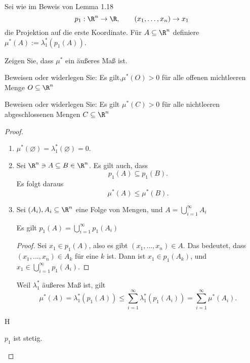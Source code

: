 \begin{Problem}
	Sei wie im Beweis von Lemma 1.18
	\[
	p_1:\R^n\to \R, \qquad (x_1,\dots,x_n)\to x_1
	\]
	die Projektion auf die erste Koordinate. F\"{u}r $A\subseteq \R^n$ definiere $\mu^*(A):=\lambda_1^*(p_1(A))$.
	\begin{parts}
		\item Zeigen Sie, dass $\mu^*$ ein äußeres Maß ist.
		\item Beweisen oder widerlegen Sie: Es gilt,$\mu^*(O)>0$ f\"{u}r alle offenen michtleeren Menge $O\subseteq \R^n$
		\item Beweisen oder widerlegen Sie: Es gilt  $\mu^*(C)>0$ f\"{u}r alle nichtleeren abgeschlossenen Mengen $C\subseteq \R^n$
	\end{parts}
\end{Problem}
\begin{proof}	
	\begin{parts}
\item 
	\begin{enumerate}[label=(\roman*)]
		\item $\mu^*(\varnothing)=\lambda_1^*(\varnothing)=0$.
		\item Sei  $\R^n\ni A\subseteq B\in \R^n$. Es gilt auch, dass
			 \[
			p_1(A)\subseteq p_1(B)
			.\]
			Es folgt daraus
			\[
			\mu^*(A)\le \mu^*(B)
			.\]
		\item Sei $(A_i),A_i\subseteq \R^n$ eine Folge von Mengen, und $A=\bigcup_{i=1}^\infty A_i$
			\begin{tcolorbox}
				\begin{Lemma}
					Es gilt $p_1(A)=\bigcup_{i=1} ^\infty p_1(A_i)$
				\end{Lemma}
				\begin{proof}
					Sei $x_1\in p_1(A)$, also es gibt $(x_1,\dots, x_n)\in A$. Das bedeutet, dass $(x_1,\dots, x_n)\in A_k$ f\"{u}r eine $k$ ist. Dann ist $x_1\in p_{1}(A_k)$, und $x_1\in \bigcup_{i=1} ^\infty p_1(A_i)$. 
				\end{proof}
			\end{tcolorbox}
			Weil $\lambda_1^*$ äußeres Maß ist, gilt
			\[
			\mu^*(A)=\lambda_1^*(p_1(A))\le\sum_{i=1} ^\infty \lambda_1^*(p_1(A_i))=\sum_{i=1}^{\infty} \mu^*(A_i)
			.\] 
	\end{enumerate}
\item H 
	\begin{tcolorbox}
		\begin{Lemma}
			$p_1$ ist stetig.
		\end{Lemma}
	\end{tcolorbox}
	\end{parts}
\end{proof}
